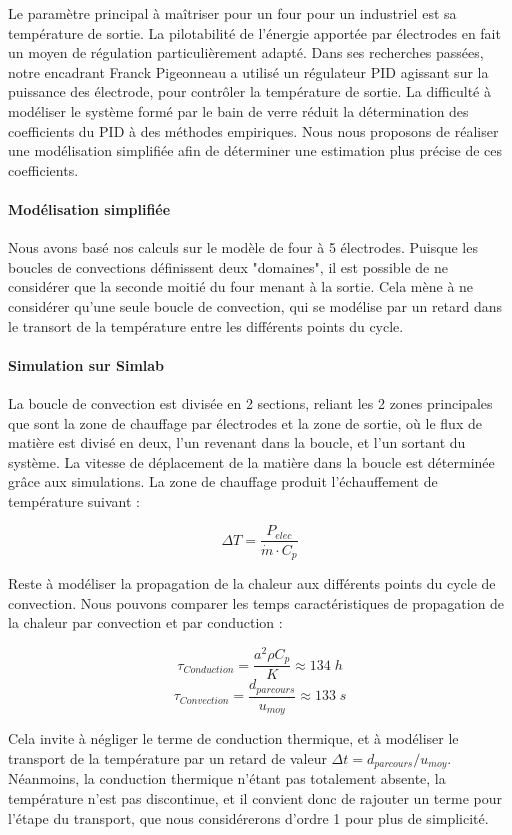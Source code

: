 \documentclass[12pt, a4paper, french, BCOR = 0pt, DIV = 10]{scrartcl}
\begin{document}
    Le paramètre principal à maîtriser pour un four pour un industriel est sa température de sortie. La pilotabilité de l'énergie apportée par électrodes en fait un moyen de régulation particulièrement adapté. Dans ses recherches passées, notre encadrant Franck Pigeonneau a utilisé un régulateur PID agissant sur la puissance des électrode, pour contrôler la température de sortie. La difficulté à modéliser le système formé par le bain de verre réduit la détermination des coefficients du PID à des méthodes empiriques. Nous nous proposons de réaliser une modélisation simplifiée afin de déterminer une estimation plus précise de ces coefficients.

    \paragraph{Modélisation simplifiée}
    Nous avons basé nos calculs sur le modèle de four à 5 électrodes. Puisque les boucles de convections définissent deux "domaines", il est possible de ne considérer que la seconde moitié du four menant à la sortie. Cela mène à ne considérer qu'une seule boucle de convection, qui se modélise par un retard dans le transort de la température entre les différents points du cycle.

    \paragraph{Simulation sur Simlab}
    La boucle de convection est divisée en 2 sections, reliant les 2 zones principales que sont la zone de chauffage par électrodes et la zone de sortie, où le flux de matière est divisé en deux, l'un revenant dans la boucle, et l'un sortant du système. La vitesse de déplacement de la matière dans la boucle est déterminée grâce aux simulations. La zone de chauffage produit l'échauffement de température suivant :
    
    $$\Delta T = \frac{P_{elec}}{\dot{m}\cdot C_p}$$
    
    Reste à modéliser la propagation de la chaleur aux différents points du cycle de convection. Nous pouvons comparer les temps caractéristiques de propagation de la chaleur par convection et par conduction :

    $$\tau_{Conduction} = \frac{a^2\rho C_p}{K} \approx 134 \; h$$
    $$\tau_{Convection} = \frac{d_{parcours}}{u_{moy}} \approx 133 \; s$$

    Cela invite à négliger le terme de conduction thermique, et à modéliser le transport de la température par un retard de valeur $\Delta t=d_{parcours}/u_{moy}$. Néanmoins, la conduction thermique n'étant pas totalement absente, la température n'est pas discontinue, et il convient donc de rajouter un terme pour l'étape du transport, que nous considérerons d'ordre 1 pour plus de simplicité.\\
\end{document}
